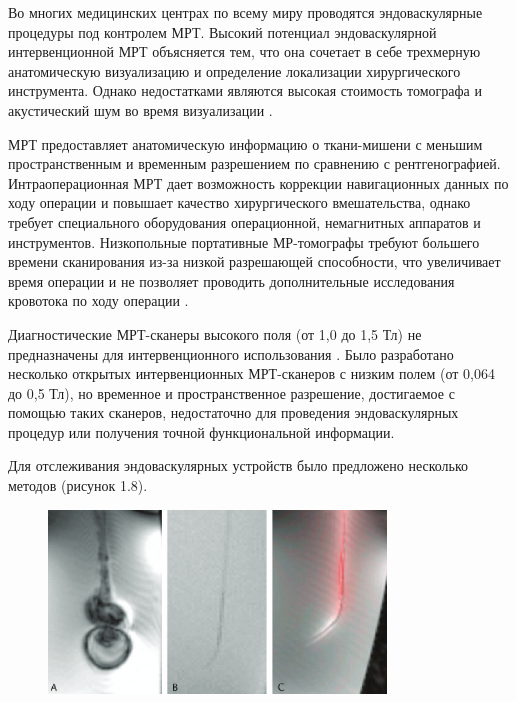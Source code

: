 Во многих медицинских центрах по всему миру проводятся эндоваскулярные процедуры под контролем МРТ. Высокий потенциал эндоваскулярной интервенционной МРТ объясняется тем, что она сочетает в себе трехмерную анатомическую визуализацию и определение локализации хирургического инструмента. Однако недостатками являются высокая стоимость томографа и акустический шум во время визуализации \cite{litlink21}. 

МРТ предоставляет анатомическую информацию о ткани-мишени с меньшим пространственным и временным разрешением по сравнению с рентгенографией. Интраоперационная МРТ дает возможность коррекции навигационных данных по ходу операции и повышает качество хирургического вмешательства, однако требует специального оборудования операционной, немагнитных аппаратов и инструментов. Низкопольные портативные МР-томографы требуют большего времени сканирования из-за низкой разрешающей способности, что увеличивает время операции и не позволяет проводить дополнительные исследования кровотока по ходу операции \cite{litlink22}.

Диагностические МРТ-сканеры высокого поля (от 1,0 до 1,5 Тл) не предназначены для интервенционного использования \cite{litlink23}. Было разработано несколько открытых интервенционных МРТ-сканеров с низким полем (от 0,064 до 0,5 Тл), но временное и пространственное разрешение, достигаемое с помощью таких сканеров, недостаточно для проведения эндоваскулярных процедур или получения точной функциональной информации.

Для отслеживания эндоваскулярных устройств было предложено несколько методов (рисунок 1.8).

\begin{figure}[!h]
\begin{center}
\includegraphics[width=0.8\textwidth]{Рисунки/МРТ.png}
\caption{\centering {}}
\label{част}
\end{center}
\end{figure}

